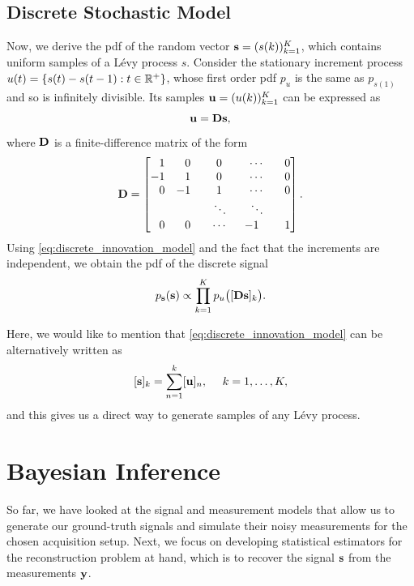 \documentclass[journal]{IEEEtran}
\begin{document}
\subsection{Discrete Stochastic Model}
Now, we derive the pdf of the random vector ${\bf{s}} = (s(k))_{k=1}^{K}$, which contains uniform samples of a L\'{e}vy process $s$. Consider the stationary increment process $u(t) = \{s(t) - s(t-1) : t \in \mathbb{R}^{+} \}$, whose first order pdf $p_u$ is the same as $p_{s(1)}$ and so is infinitely divisible. Its samples ${\bf{u}} = (u(k))_{k=1}^{K}$ can be expressed as 
\begin{equation}\label{eq:discrete_innovation_model}
    {\bf{u}} = {\bf{D}} {\bf{s}},
\end{equation}
where ${\bf{D}}$ is a finite-difference matrix of the form
\begin{equation}
    {\bf{D}} = \begin{bmatrix}
        \phantom{-}1 & \phantom{-}0 & \phantom{-}0  & \phantom{-}\cdots  & \phantom{-}0\\
        -1 & \phantom{-}1 & \phantom{-}0  & \phantom{-}\cdots  & \phantom{-}0\\
        \phantom{-}0 & -1 & \phantom{-}1  & \phantom{-}\cdots  & \phantom{-}0\\
         &  & \phantom{-}\ddots & \phantom{-}\ddots &  \\
         \phantom{-}0 & \phantom{-}0  & \phantom{-}\cdots & -1 & \phantom{-}1
    \end{bmatrix}.
\end{equation}
Using \eqref{eq:discrete_innovation_model} and the fact that the increments are independent, we obtain the pdf of the discrete signal
\begin{equation}\label{eq:discrete_pdf}
    p_{{\bf{s}}}({\bf{s}}) \propto \prod_{k = 1}^{K} p_{u}\big([{\bf{D}} {\bf{s}}]_k\big).
\end{equation}

Here, we would like to mention that \eqref{eq:discrete_innovation_model} can be alternatively written as
\begin{equation}\label{eq:gen_levy}
    [{\bf{s}}]_k = \sum_{n=1}^{k} [{\bf{u}}]_n, \ \ \ \ k = 1, \ldots, K,
\end{equation}
and this gives us a direct way to generate samples of any L\'{e}vy process. 


\section{Bayesian Inference}
So far, we have looked at the signal and measurement models that allow us to generate our ground-truth signals and simulate their noisy measurements for the chosen acquisition setup. Next, we focus on developing statistical estimators for the reconstruction problem at hand, which is to recover the signal ${\bf{s}}$ from the measurements ${\bf{y}}$.
\end{document}
